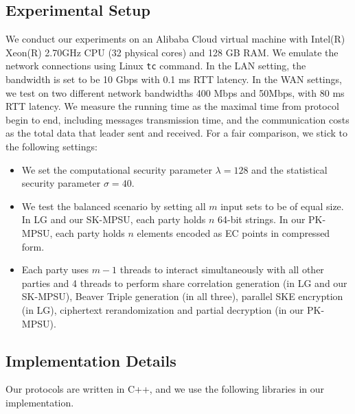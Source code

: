 \subsection{Experimental Setup}

We conduct our experiments on an Alibaba Cloud virtual machine with Intel(R) Xeon(R) 2.70GHz CPU (32 physical cores) and 128 GB RAM.
We emulate the network connections using Linux \texttt{tc} command.
In the LAN setting, the bandwidth is set to be 10 Gbps with 0.1 ms RTT latency.
In the WAN settings, we test on two different network bandwidths 400 Mbps and 50Mbps, with 80 ms RTT latency. 
We measure the running time as the maximal time from protocol begin to end, including messages transmission time, and the communication costs as the total data that leader sent and received.
For a fair comparison, we stick to the following settings: 
\begin{itemize}
\item We set the computational security parameter $\lambda = 128$ and the statistical security parameter $\sigma = 40$. 

\item We test the balanced scenario by setting all $m$ input sets to be of equal size. In LG and our SK-MPSU, each party holds $n$ 64-bit strings. 
In our PK-MPSU, each party holds $n$ elements encoded as EC points in compressed form.


\item Each party uses $m - 1$ threads to interact simultaneously with all other parties and 4 threads to perform share correlation generation (in LG and our SK-MPSU), Beaver Triple generation (in all three), parallel SKE encryption (in LG), ciphertext rerandomization and partial decryption (in our PK-MPSU).
\end{itemize}

\subsection{Implementation Details}
Our protocols are written in C++, and  we use the following libraries in our implementation.

